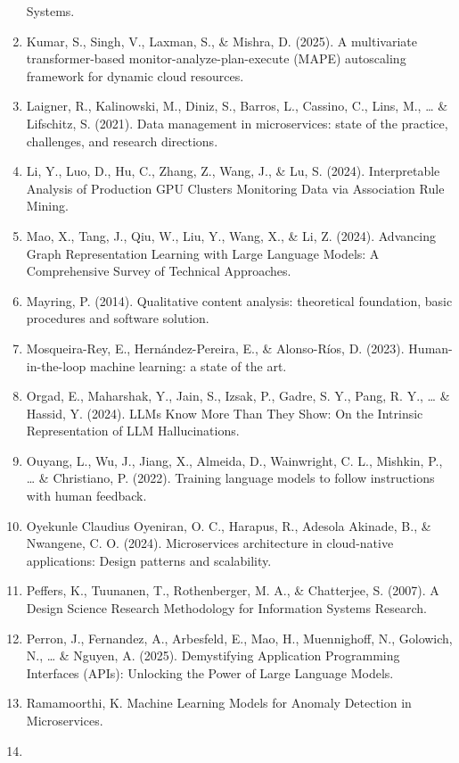 \documentclass[
  a4paper,
  12pt,
  oneside,
  open=any,
  BCOR=12mm,
  DIV=14,
  parskip=half*,
  headsepline,
  footsepline,
  pointlessnumbers,
  liststotoc,
  numbers=noenddot,
  listof=totoc]{scrartcl}
\begin{document}
\begin{enumerate}
  Systems.
\item
  Kumar, S., Singh, V., Laxman, S., \& Mishra, D. (2025). A multivariate
  transformer-based monitor-analyze-plan-execute (MAPE) autoscaling
  framework for dynamic cloud resources.
\item
  Laigner, R., Kalinowski, M., Diniz, S., Barros, L., Cassino, C., Lins,
  M., \ldots{} \& Lifschitz, S. (2021). Data management in
  microservices: state of the practice, challenges, and research
  directions.
\item
  Li, Y., Luo, D., Hu, C., Zhang, Z., Wang, J., \& Lu, S. (2024).
  Interpretable Analysis of Production GPU Clusters Monitoring Data via
  Association Rule Mining.
\item
  Mao, X., Tang, J., Qiu, W., Liu, Y., Wang, X., \& Li, Z. (2024).
  Advancing Graph Representation Learning with Large Language Models: A
  Comprehensive Survey of Technical Approaches.
\item
  Mayring, P. (2014). Qualitative content analysis: theoretical
  foundation, basic procedures and software solution.
\item
  Mosqueira-Rey, E., Hernández-Pereira, E., \& Alonso-Ríos, D. (2023).
  Human-in-the-loop machine learning: a state of the art.
\item
  Orgad, E., Maharshak, Y., Jain, S., Izsak, P., Gadre, S. Y., Pang, R.
  Y., \ldots{} \& Hassid, Y. (2024). LLMs Know More Than They Show: On
  the Intrinsic Representation of LLM Hallucinations.
\item
  Ouyang, L., Wu, J., Jiang, X., Almeida, D., Wainwright, C. L.,
  Mishkin, P., \ldots{} \& Christiano, P. (2022). Training language
  models to follow instructions with human feedback.
\item
  Oyekunle Claudius Oyeniran, O. C., Harapus, R., Adesola Akinade, B.,
  \& Nwangene, C. O. (2024). Microservices architecture in cloud-native
  applications: Design patterns and scalability.
\item
  Peffers, K., Tuunanen, T., Rothenberger, M. A., \& Chatterjee, S.
  (2007). A Design Science Research Methodology for Information Systems
  Research.
\item
  Perron, J., Fernandez, A., Arbesfeld, E., Mao, H., Muennighoff, N.,
  Golowich, N., \ldots{} \& Nguyen, A. (2025). Demystifying Application
  Programming Interfaces (APIs): Unlocking the Power of Large Language
  Models.
\item
  Ramamoorthi, K. Machine Learning Models for Anomaly Detection in
  Microservices.
\item

\end{enumerate}
\end{document}
